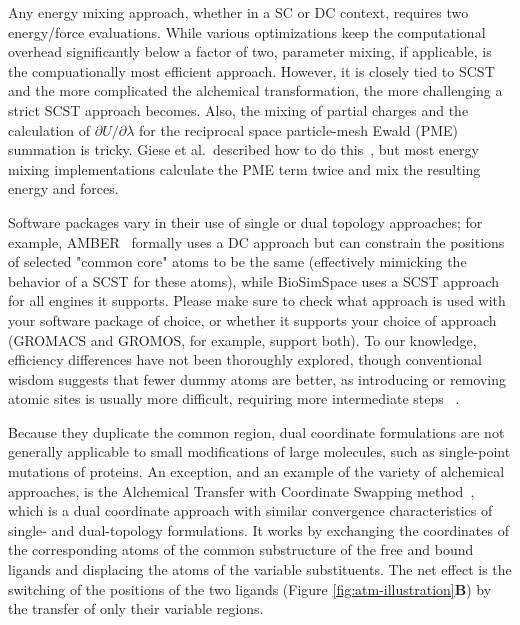 \documentclass[9pt,bestpractices]{livecoms}
\begin{document}
Any energy mixing approach, whether in a SC or DC context, requires two energy/force evaluations. While various optimizations keep the computational overhead significantly below a factor of two,  parameter mixing, if applicable, is the compuationally most efficient approach. However, it is closely tied to SCST and the more complicated the alchemical transformation, the more challenging a strict SCST approach becomes. Also, the mixing of partial charges and the calculation of $\partial U/\partial\lambda$ for the reciprocal space particle-mesh Ewald (PME) summation is tricky. Giese et al.\ described how to do this~\cite{Giese_2018}, but most energy mixing implementations calculate the PME term twice and mix the resulting energy and forces.

Software packages vary in their use of single or dual topology approaches; for example, AMBER~\cite{Case_JChemInfModel_2025_v65_p7835} formally uses a DC approach but can constrain the positions of selected "common core" atoms to be the same (effectively mimicking the behavior of a SCST for these atoms), while BioSimSpace uses a SCST approach for all engines it supports. Please make sure to check what approach is used with your software package of choice, or whether it supports your choice of approach (GROMACS and GROMOS, for example, support both). 
To our knowledge, efficiency differences have not been thoroughly explored, though conventional wisdom suggests that fewer dummy atoms are better, as introducing or removing atomic sites is usually more difficult, requiring more intermediate steps ~\cite{liu2013lead, mobley2012perspective}.

Because they duplicate the common region, dual coordinate formulations are not generally applicable to small modifications of large molecules, such as single-point mutations of proteins. An exception, and an example of the variety of alchemical approaches, is the Alchemical Transfer with Coordinate Swapping method~\cite{gallicchio2025mutants}, which is a dual coordinate approach with similar convergence characteristics of single- and dual-topology formulations. It works by exchanging the coordinates of the corresponding atoms of the common substructure of the free and bound ligands and displacing the atoms of the variable substituents. The net effect is the switching of the positions of the two ligands (Figure \ref{fig:atm-illustration}\textbf{B}) by the transfer of only their variable regions.
\end{document}
